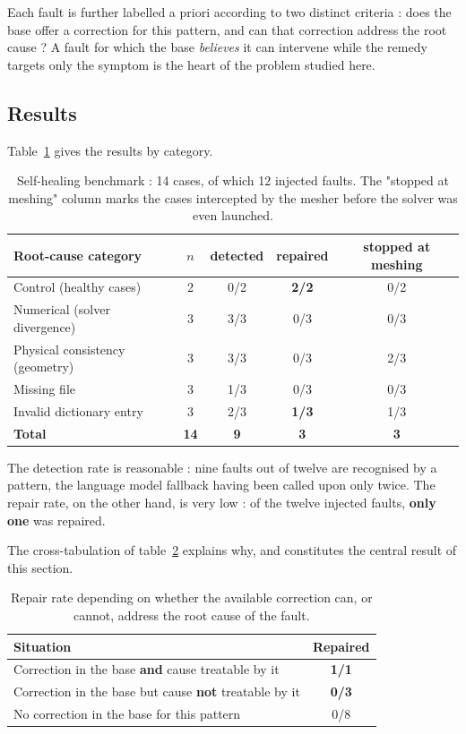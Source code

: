 \documentclass[12pt,a4paper]{report}
\begin{document}
Each fault is further labelled a priori according to two distinct criteria : does
the base offer a correction for this pattern, and can that correction address the root cause ? A fault for which the base \emph{believes} it
can intervene while the remedy targets only the symptom is the heart of the
problem studied here.

\subsection{Results}

Table~\ref{tab:selfheal} gives the results by category.

\begin{table}[htbp]
\centering
\caption[Self-healing benchmark]{Self-healing benchmark : 14 cases, of which 12
injected faults. The "stopped at meshing" column marks the cases intercepted
by the mesher before the solver was even launched.}
\label{tab:selfheal}
\begin{tabularx}{\textwidth}{@{}Xcccc@{}}
\toprule
\textbf{Root-cause category} & \textbf{$n$} & \textbf{detected} &
\textbf{repaired} & \textbf{stopped at meshing}\\
\midrule
Control (healthy cases) & 2 & 0/2 & \textbf{2/2} & 0/2\\
Numerical (solver divergence) & 3 & 3/3 & 0/3 & 0/3\\
Physical consistency (geometry) & 3 & 3/3 & 0/3 & 2/3\\
Missing file & 3 & 1/3 & 0/3 & 0/3\\
Invalid dictionary entry & 3 & 2/3 & \textbf{1/3} & 1/3\\
\midrule
\textbf{Total} & \textbf{14} & \textbf{9} & \textbf{3} & \textbf{3}\\
\bottomrule
\end{tabularx}
\end{table}

The detection rate is reasonable : nine faults out of twelve are recognised by a
pattern, the language model fallback having been called upon only twice. The
repair rate, on the other hand, is very low : of the twelve injected faults,
\textbf{only one} was repaired.

The cross-tabulation of table~\ref{tab:selfheal-croise} explains why, and
constitutes the central result of this section.

\begin{table}[htbp]
\centering
\caption[Repair versus treatability of the cause]{Repair rate depending on
whether the available correction can, or cannot, address the root cause of the
fault.}
\label{tab:selfheal-croise}
\begin{tabularx}{0.9\textwidth}{@{}Xc@{}}
\toprule
\textbf{Situation} & \textbf{Repaired}\\
\midrule
Correction in the base \textbf{and} cause treatable by it & \textbf{1/1}\\
Correction in the base but cause \textbf{not} treatable by it &
  \textcolor{cAlert}{\textbf{0/3}}\\
No correction in the base for this pattern & 0/8\\
\bottomrule
\end{tabularx}
\end{table}
\end{document}
